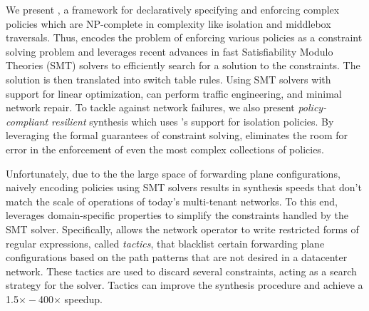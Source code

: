 We present \Name, a framework for declaratively specifying and
enforcing complex policies which are NP-complete
in complexity like isolation and middlebox
traversals. 
Thus, \Name 
encodes the problem of enforcing various
policies as a constraint solving problem and
leverages recent advances in
fast Satisfiability Modulo Theories (SMT) solvers
to efficiently search for a solution to the constraints. 
The solution is then translated into switch table rules. 
Using SMT solvers with 
support for linear optimization, \name can perform traffic engineering, and
minimal network repair. To tackle against network failures, we also
present \emph{policy-compliant resilient} synthesis which uses \name's
support for isolation policies. 
By leveraging the formal guarantees of constraint solving, \Name
eliminates the room for error in the enforcement of even the most
complex collections of policies. 


Unfortunately, due to the the large space of forwarding plane
configurations, naively encoding policies using SMT solvers results in
synthesis speeds that don't match the scale of operations of today's
multi-tenant networks.
To this
end, \Name leverages domain-specific properties to simplify the
constraints handled by the SMT solver.  Specifically, \Name allows the
network operator to write 
restricted forms of regular expressions, called \emph{tactics}, 
that blacklist certain
forwarding plane configurations based on the path patterns   
that are not desired in a datacenter network. 
These tactics are used to discard several constraints, 
acting as a search strategy for the solver.
Tactics can improve the synthesis procedure and achieve
a 1.5$\times - $400$\times$ speedup. 

